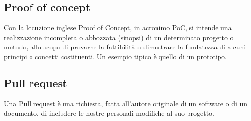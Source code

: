 \subsection*{Proof of concept}
Con la locuzione inglese Proof of Concept, in acronimo PoC, si intende una realizzazione incompleta o abbozzata (sinopsi) di un determinato progetto o metodo, allo scopo di provarne la fattibilità o dimostrare la fondatezza di alcuni principi o concetti costituenti. Un esempio tipico è quello di un prototipo.

\subsection*{Pull request}
Una Pull request è una richiesta, fatta all’autore originale di un software o di un documento, di includere le nostre personali modifiche al suo progetto.


